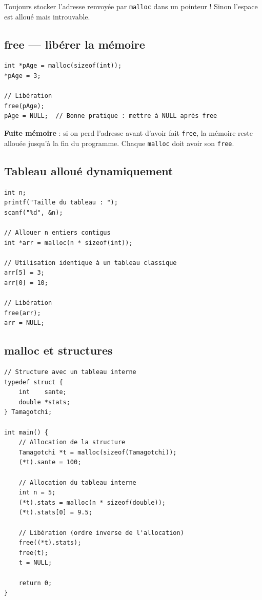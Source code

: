 \documentclass[12pt,a4paper]{article}
\begin{document}
\begin{important}
Toujours stocker l'adresse renvoyée par \texttt{malloc} dans un pointeur ! Sinon l'espace est alloué mais introuvable.
\end{important}

\subsection{free — libérer la mémoire}

\begin{lstlisting}[caption={Libération avec free}]
int *pAge = malloc(sizeof(int));
*pAge = 3;

// Libération
free(pAge);
pAge = NULL;  // Bonne pratique : mettre à NULL après free
\end{lstlisting}

\begin{important}
\textbf{Fuite mémoire} : si on perd l'adresse avant d'avoir fait \texttt{free}, la mémoire reste allouée jusqu'à la fin du programme. Chaque \texttt{malloc} doit avoir son \texttt{free}.
\end{important}

\subsection{Tableau alloué dynamiquement}

\begin{lstlisting}[caption={Tableau de taille choisie à l'exécution}]
int n;
printf("Taille du tableau : ");
scanf("%d", &n);

// Allouer n entiers contigus
int *arr = malloc(n * sizeof(int));

// Utilisation identique à un tableau classique
arr[5] = 3;
arr[0] = 10;

// Libération
free(arr);
arr = NULL;
\end{lstlisting}

\subsection{malloc et structures}

\begin{lstlisting}[caption={Allocation dynamique d'une structure}]
// Structure avec un tableau interne
typedef struct {
    int    sante;
    double *stats;
} Tamagotchi;

int main() {
    // Allocation de la structure
    Tamagotchi *t = malloc(sizeof(Tamagotchi));
    (*t).sante = 100;

    // Allocation du tableau interne
    int n = 5;
    (*t).stats = malloc(n * sizeof(double));
    (*t).stats[0] = 9.5;

    // Libération (ordre inverse de l'allocation)
    free((*t).stats);
    free(t);
    t = NULL;

    return 0;
}
\end{lstlisting}
\end{document}
